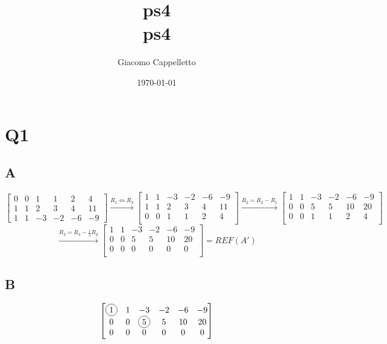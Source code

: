 \documentclass{report}
\title{\Huge{ps4}\\ps4}
\author{\huge{Giacomo Cappelletto}}
\date{\today}
\begin{document}
\section*{Q1}

\subsection*{A}

\[
	\begin{bmatrix}
		0 & 0 & 1  & 1  & 2  & 4  \\
		1 & 1 & 2  & 3  & 4  & 11 \\
		1 & 1 & -3 & -2 & -6 & -9
	\end{bmatrix}
	\xrightarrow{R_1 \Leftrightarrow R_3}
	\begin{bmatrix}
		1 & 1 & -3 & -2 & -6 & -9 \\
		1 & 1 & 2  & 3  & 4  & 11 \\
		0 & 0 & 1  & 1  & 2  & 4  \\
	\end{bmatrix}
	\xrightarrow{R_2 = R_2 - R_1}
	\begin{bmatrix}
		1 & 1 & -3 & -2 & -6 & -9 \\
		0 & 0 & 5  & 5  & 10 & 20 \\
		0 & 0 & 1  & 1  & 2  & 4  \\
	\end{bmatrix}
\]
\[
	\xrightarrow{R_3 = R_3 - \frac{1}{5}R_2}
	\begin{bmatrix}
		1 & 1 & -3 & -2 & -6 & -9 \\
		0 & 0 & 5  & 5  & 10 & 20 \\
		0 & 0 & 0  & 0  & 0  & 0  \\
	\end{bmatrix}
	= REF(A')
\]

\subsection*{B}

\[
	\begin{bmatrix}
		\tikz[baseline=(char.base)] \node[draw,circle,inner sep=2pt] (char) {1}; & 1 & -3                                                                       & -2 & -6 & -9 \\
		0                                                                        & 0 & \tikz[baseline=(char.base)] \node[draw,circle,inner sep=2pt] (char) {5}; & 5  & 10 & 20 \\
		0                                                                        & 0 & 0                                                                        & 0  & 0  & 0  \\
	\end{bmatrix}
\]
\end{document}
